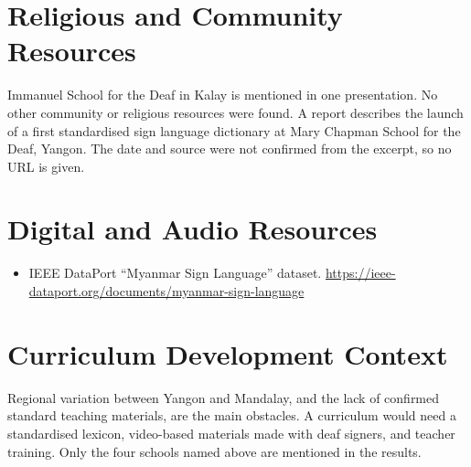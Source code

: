 \documentclass[12pt]{article}
\begin{document}
\section{Religious and Community Resources}
Immanuel School for the Deaf in Kalay is mentioned in one presentation. No other community or religious resources were found. A report describes the launch of a first standardised sign language dictionary at Mary Chapman School for the Deaf, Yangon. The date and source were not confirmed from the excerpt, so no URL is given.

\section{Digital and Audio Resources}
\begin{itemize}
\item IEEE DataPort ``Myanmar Sign Language'' dataset. \url{https://ieee-dataport.org/documents/myanmar-sign-language}
\end{itemize}

\section{Curriculum Development Context}
Regional variation between Yangon and Mandalay, and the lack of confirmed standard teaching materials, are the main obstacles. A curriculum would need a standardised lexicon, video-based materials made with deaf signers, and teacher training. Only the four schools named above are mentioned in the results.
\end{document}
